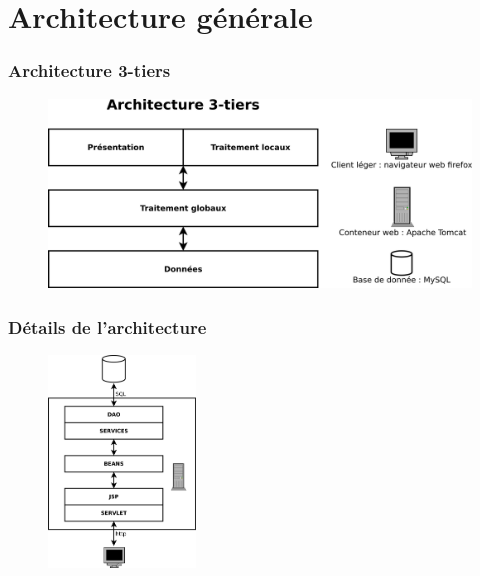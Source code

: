\documentclass{beamer}
\begin{document}
\section{Architecture générale}

\begin{frame}[label=Architecture 3-tiers]
  \frametitle{Architecture 3-tiers}
\begin{figure}[H]
\label{schema}
  \centering
      \includegraphics[width=1\textwidth]{architectureVitameal_3tiers.png} %
\end{figure}
\end{frame}

\begin{frame}[label=Détails de l'architecture]
  \frametitle{Détails de l'architecture}
\begin{figure}[H]
\label{schema}
  \centering
      \includegraphics[width=0.35\textwidth]{architectureVitameal_details.png} %
\end{figure}
\end{frame}
\end{document}
